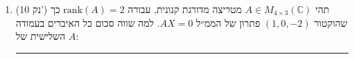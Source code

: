 \documentclass[12pt, a4paper]{article}
\newcommand{\cc}{\mathbb{C}}
\newcommand{\points}[1]{(#1 נק') }
\begin{document}
\begin{enumerate}
אם
$a=2$
אז נקבל
$$ \begin{pmatrix}
 1&2&3&\bigm|&2\\
 0&1&2&\bigm|&-1\\
 0&0&0&\bigm|&3\\
 \end{pmatrix}
$$
ובגלל השורת סתירה, לממ״ל אין פתרון, אז סעיף (ב) שגוי.
מכך נקבל  שהסעיף הנכון הוא סעיף (א).
\newpage


\item\points{10}
תהי
$A\in M_{4\times 3}(\cc)$
מטריצה מדורגת קנונית, עבורה
$\mathrm{rank}(A)=2$
 כך שהוקטור
$(1,0,-2)$
פתרון של הממ״ל
$AX=0$.
למה שווה סכום כל האיברים בעמודה השלישית של
$A$:
\begin{enumerate}
\end{enumerate}

\noindent\rule{16cm}{0.4pt}


\end{enumerate}
\end{document}

